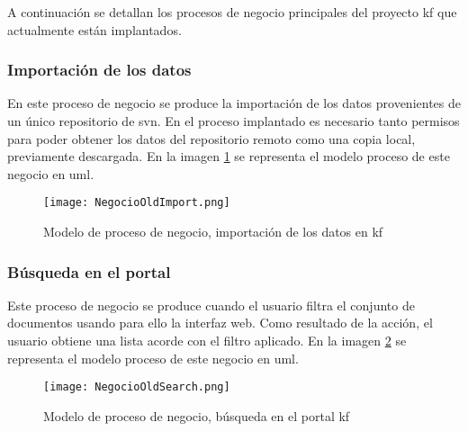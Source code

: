 A continuación se detallan los procesos de negocio principales del proyecto \gls{kf} que actualmente están implantados.

\subsubsection{Importación de los datos}
En este proceso de negocio se produce la importación de los datos provenientes de un único repositorio de \gls{svn}. En el proceso implantado es necesario tanto permisos para poder obtener los datos del repositorio remoto como una copia local, previamente descargada. En la imagen \ref{image:negimport1} se representa el modelo proceso de este negocio en \gls{uml}.

\begin{figure}[H]
  \centering
    \texttt{[image: NegocioOldImport.png]} 
  \caption{Modelo de proceso de negocio, importación de los datos en \gls{kf}}
  \label{image:negimport1}
\end{figure}

\subsubsection{Búsqueda en el portal}
Este proceso de negocio se produce cuando el usuario filtra el conjunto de documentos usando para ello la interfaz web. Como resultado de la acción, el usuario obtiene una lista acorde con el filtro aplicado.  En la imagen \ref{image:negsearch1} se representa el modelo proceso de este negocio en \gls{uml}.

\begin{figure}[H]
  \centering
    \texttt{[image: NegocioOldSearch.png]} 
  \caption{Modelo de proceso de negocio, búsqueda en el portal \gls{kf}}
  \label{image:negsearch1}
\end{figure}


\subsection{}
\begin{comment}
Esta sección debe contener información general sobre el entorno tecnológico en la organización del cliente antes del comienzo del desarrollo del sistema software, incluyendo hardware, redes, software, etc.
\end{comment}
\label{subsection:entornotech}

